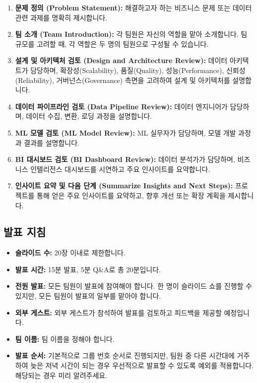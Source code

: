 \documentclass[11pt,a4paper]{article}
\theoremstyle{definition}
\begin{document}
\begin{enumerate}
    \item \textbf{문제 정의 (Problem Statement):} 해결하고자 하는 비즈니스 문제 또는 데이터 관련 과제를 명확히 제시합니다.
    \item \textbf{팀 소개 (Team Introduction):} 각 팀원은 자신의 역할을 맡아 소개합니다. 팀 규모를 고려할 때, 각 역할은 두 명의 팀원으로 구성될 수 있습니다.
    \item \textbf{설계 및 아키텍처 검토 (Design and Architecture Review):} 데이터 아키텍트가 담당하며, 확장성(Scalability), 품질(Quality), 성능(Performance), 신뢰성(Reliability), 거버넌스(Governance) 측면을 고려하여 설계 및 아키텍처를 설명합니다.
    \item \textbf{데이터 파이프라인 검토 (Data Pipeline Review):} 데이터 엔지니어가 담당하며, 데이터 수집, 변환, 로딩 과정을 설명합니다.
    \item \textbf{ML 모델 검토 (ML Model Review):} ML 실무자가 담당하며, 모델 개발 과정과 결과를 설명합니다.
    \item \textbf{BI 대시보드 검토 (BI Dashboard Review):} 데이터 분석가가 담당하며, 비즈니스 인텔리전스 대시보드를 시연하고 주요 인사이트를 요약합니다.
    \item \textbf{인사이트 요약 및 다음 단계 (Summarize Insights and Next Steps):} 프로젝트를 통해 얻은 주요 인사이트를 요약하고, 향후 개선 또는 확장 계획을 제시합니다.
\end{enumerate}

\subsection{발표 지침}
\begin{itemize}
    \item \textbf{슬라이드 수:} 20장 이내로 제한합니다.
    \item \textbf{발표 시간:} 15분 발표, 5분 Q\&A로 총 20분입니다.
    \item \textbf{전원 발표:} 모든 팀원이 발표에 참여해야 합니다. 한 명이 슬라이드 쇼를 진행할 수 있지만, 모든 팀원이 발표의 일부를 맡아야 합니다.
    \item \textbf{외부 게스트:} 외부 게스트가 참석하여 발표를 검토하고 피드백을 제공할 예정입니다.
    \item \textbf{팀 이름:} 팀 이름을 정해야 합니다.
    \item \textbf{발표 순서:} 기본적으로 그룹 번호 순서로 진행되지만, 팀원 중 다른 시간대에 거주하여 늦은 저녁 시간이 되는 경우 우선적으로 발표할 수 있도록 예외를 적용합니다. 해당되는 경우 미리 알려주세요.
\end{itemize}
\end{document}
